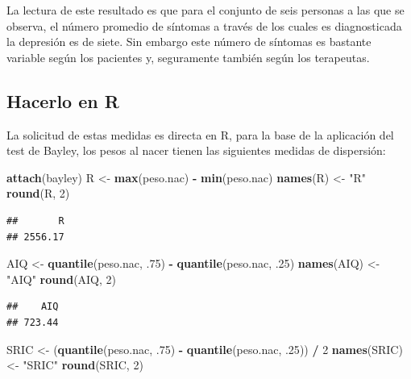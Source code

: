 \documentclass[]{book}
\newenvironment{Shaded}{\begin{snugshade}}{\end{snugshade}}
\newcommand{\DecValTok}[1]{\textcolor[rgb]{0.00,0.00,0.81}{#1}}
\newcommand{\FloatTok}[1]{\textcolor[rgb]{0.00,0.00,0.81}{#1}}
\newcommand{\KeywordTok}[1]{\textcolor[rgb]{0.13,0.29,0.53}{\textbf{#1}}}
\newcommand{\NormalTok}[1]{#1}
\newcommand{\OperatorTok}[1]{\textcolor[rgb]{0.81,0.36,0.00}{\textbf{#1}}}
\newcommand{\StringTok}[1]{\textcolor[rgb]{0.31,0.60,0.02}{#1}}
\begin{document}
La lectura de este resultado es que para el conjunto de seis personas a las que se observa, el número promedio de síntomas a través de los
cuales es diagnosticada la depresión es de siete. Sin embargo este
número de síntomas es bastante variable según los pacientes y,
seguramente también según los terapeutas.

\hypertarget{hacerlo-en-r-1}{%
\subsection{Hacerlo en R}\label{hacerlo-en-r-1}}

La solicitud de estas medidas es directa en R, para la base de la aplicación del test de Bayley, los pesos al nacer tienen las siguientes medidas de dispersión:

\begin{Shaded}
\begin{Highlighting}[]
\KeywordTok{attach}\NormalTok{(bayley)}
\NormalTok{R <-}\StringTok{ }\KeywordTok{max}\NormalTok{(peso.nac) }\OperatorTok{-}\StringTok{ }\KeywordTok{min}\NormalTok{(peso.nac)}
\KeywordTok{names}\NormalTok{(R) <-}\StringTok{ "R"}
\KeywordTok{round}\NormalTok{(R, }\DecValTok{2}\NormalTok{)}
\end{Highlighting}
\end{Shaded}

\begin{verbatim}
##       R 
## 2556.17
\end{verbatim}

\begin{Shaded}
\begin{Highlighting}[]
\NormalTok{AIQ <-}\StringTok{ }\KeywordTok{quantile}\NormalTok{(peso.nac, }\FloatTok{.75}\NormalTok{) }\OperatorTok{-}\StringTok{ }\KeywordTok{quantile}\NormalTok{(peso.nac, }\FloatTok{.25}\NormalTok{)}
\KeywordTok{names}\NormalTok{(AIQ) <-}\StringTok{ "AIQ"}
\KeywordTok{round}\NormalTok{(AIQ, }\DecValTok{2}\NormalTok{)}
\end{Highlighting}
\end{Shaded}

\begin{verbatim}
##    AIQ 
## 723.44
\end{verbatim}

\begin{Shaded}
\begin{Highlighting}[]
\NormalTok{SRIC <-}\StringTok{ }\NormalTok{(}\KeywordTok{quantile}\NormalTok{(peso.nac, }\FloatTok{.75}\NormalTok{) }\OperatorTok{-}\StringTok{ }\KeywordTok{quantile}\NormalTok{(peso.nac, }\FloatTok{.25}\NormalTok{)) }\OperatorTok{/}\StringTok{ }\DecValTok{2}
\KeywordTok{names}\NormalTok{(SRIC) <-}\StringTok{ "SRIC"}
\KeywordTok{round}\NormalTok{(SRIC, }\DecValTok{2}\NormalTok{)}
\end{Highlighting}
\end{Shaded}
\end{document}

